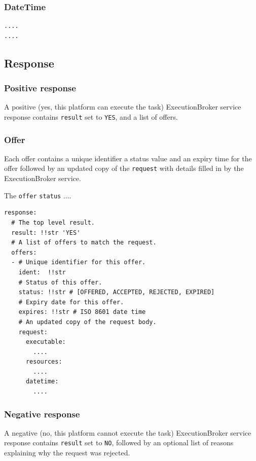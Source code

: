 \documentclass[11pt,a4paper]{ivoa}
\newcommand{\execbrokerclass} {ExecutionBroker}
\newcommand{\codeword}[1] {\texttt{#1}}
\begin{document}
\subsubsection{DateTime}
\label{datamodel-datetime}

\begin{lstlisting}[]
....
....
\end{lstlisting}

\subsection{Response}
\label{datamodel-response}

\subsubsection{Positive response}
\label{datamodel-positive-response}
A positive (yes, this platform can execute the task) \execbrokerclass{} service response contains \codeword{result}
set to \codeword{YES}, and a list of offers.

\subsubsection{Offer}
\label{datamodel-offer}

Each offer contains a unique identifier a status value and an expiry time for the offer
followed by an updated copy of the \codeword{request} with details
filled in by the \execbrokerclass{} service.

The \codeword{offer} \codeword{status} ....

\begin{lstlisting}[]
response:
  # The top level result.
  result: !!str 'YES'
  # A list of offers to match the request.
  offers:
  - # Unique identifier for this offer.
    ident:  !!str
    # Status of this offer.
    status: !!str # [OFFERED, ACCEPTED, REJECTED, EXPIRED]
    # Expiry date for this offer.
    expires: !!str # ISO 8601 date time
    # An updated copy of the request body.
    request:
      executable:
        ....
      resources:
        ....
      datetime:
        ....
\end{lstlisting}

\subsubsection{Negative response}
\label{datamodel-negative-response}

A negative (no, this platform cannot execute the task) \execbrokerclass{} service response contains \codeword{result}
set to \codeword{NO}, followed by an optional list of reasons
explaining why the request was rejected.
\end{document}

